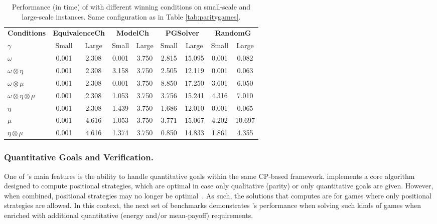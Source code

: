 \documentclass[runningheads]{llncs}
\begin{document}

\begin{table}[ht]
\centering
\caption{Performance (in time) of \nocq with different winning conditions on small-scale and large-scale instances. Same configuration as in Table \ref{tab:paritygames}.}
\setlength{\tabcolsep}{1.2mm}
{\small 
\begin{tabular}{l|cc|cc|cc|cc}
\toprule
\textbf{Conditions} & \multicolumn{2}{c|}{\textbf{EquivalenceCh}} & \multicolumn{2}{c|}{\textbf{ModelCh}} & \multicolumn{2}{c|}{\textbf{PGSolver}} & \multicolumn{2}{c}{\textbf{RandomG}} \\
$\gamma$ & Small & Large & Small & Large & Small & Large & Small & Large \\
\midrule
\textbf{$\omega$}                           & 0.001 & 2.308 & 0.001 & 3.750 & 2.815 & 15.095 & 0.001 &  0.082 \\
\textbf{$\omega \otimes \eta$}              & 0.001 & 2.308 & 3.158 & 3.750 & 2.505 & 12.119 & 0.001 &  0.063 \\
\textbf{$\omega \otimes \mu$}               & 0.001 & 2.308 & 0.001 & 3.750 & 8.850 & 17.250 & 3.601 &  6.050 \\
\textbf{$\omega \otimes \eta \otimes \mu$}  & 0.001 & 2.308 & 1.053 & 3.750 & 3.756 & 15.241 & 4.316 &  7.010 \\
\textbf{$\eta$}                             & 0.001 & 2.308 & 1.439 & 3.750 & 1.686 & 12.010 & 0.001 &  0.065 \\
\textbf{$\mu$}                              & 0.001 & 4.616 & 1.053 & 3.750 & 3.771 & 15.067 & 4.202 & 10.697 \\
\textbf{$\eta \otimes \mu$}                 & 0.001 & 4.616 & 1.374 & 3.750 & 0.850 & 14.833 & 1.861 &  4.355 \\
\bottomrule
\end{tabular}
}
\label{tab:quantitativeparitygames}
\end{table}

\subsubsection*{Quantitative Goals and Verification.}
One of \nocq's main features is the ability to handle quantitative goals within the same CP-based framework. 
%
\nocq implements a core algorithm designed to compute positional strategies, which are optimal in case only qualitative (parity) or only quantitative goals are given. However, when combined, positional strategies may no longer be optimal~\cite{ChatterjeeHJ05,Chatterjee:2010}. As such, the solutions that \nocq computes are for games where only positional strategies are allowed. 
%
In this context, the next set of benchmarks demonstrates \nocq's performance when solving such kinds of games when enriched with additional quantitative (energy and/or mean-payoff) requirements.  
\end{document}
